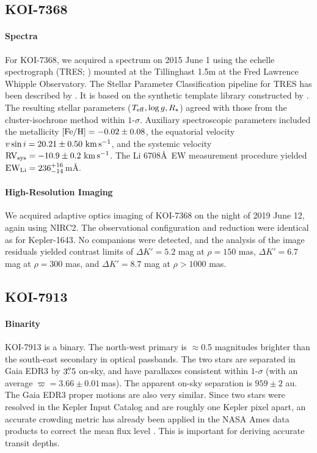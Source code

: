 \documentclass[12pt,twocolumn,tighten,linenumbers,trackchanges]{aastex63}
\newcommand{\mkms}{{\rm \,km\,s^{-1}}}  %
\begin{document}
\subsection{KOI-7368}
\paragraph{Spectra}
For KOI-7368, we acquired a spectrum on 2015 June 1 using the echelle
spectrograph (TRES; \citealt{furesz_tres_2008}) mounted at the
Tillinghast 1.5m at the Fred Lawrence Whipple Observatory.  The
Stellar Parameter Classification pipeline for TRES has been described
by \citet{2021tsc2.confE.124B}.  It is based on the synthetic template
library constructed by \citet{Buchhave2012}.  The resulting stellar
parameters ($T_{\rm eff}, \log g, R_\star$) agreed with those from the
cluster-isochrone method within $1$-$\sigma$.  Auxiliary
spectroscopic parameters included the metallicity $[{\rm Fe/H}]= -0.02
\pm 0.08$, the equatorial velocity $v\sin i = 20.21 \pm 0.50\,\mkms$,
and the systemic velocity ${\rm RV}_{\rm sys} = -10.9 \pm 0.2\,\mkms$.
The Li 6708\AA\ EW measurement procedure yielded ${\rm EW}_{\rm Li} =
236^{+16}_{-14}$\,m\AA.

\paragraph{High-Resolution Imaging}
We acquired adaptive optics imaging of KOI-7368 on the night of 2019
June 12, again using NIRC2.  The observational configuration and
reduction were identical as for Kepler-1643.  No companions were
detected, and the analysis of the image residuals yielded contrast
limits of $\Delta K' = 5.2$ mag at $\rho = 150$ mas, $\Delta K' = 6.7$
mag at $\rho = 300$ mas, and $\Delta K' = 8.7$ mag at $\rho > 1000$
mas.

\subsection{KOI-7913}
\label{subsec:koi7913}

\paragraph{Binarity}
KOI-7913 is a binary.  The north-west primary is
$\approx$0.5 magnitudes brighter than the south-east secondary in
optical passbands.  The two stars are separated in Gaia EDR3 by
$3\mbox{$.\!\!^{\prime\prime}$}5$ on-sky, and have parallaxes consistent within $1$-$\sigma$
(with an average $\varpi=3.66 \pm 0.01$\,mas).  The apparent on-sky
separation is $959 \pm 2$ au.  The Gaia EDR3 proper motions are also
very similar.  Since two stars were resolved in the Kepler Input
Catalog and are roughly one Kepler pixel apart, an accurate crowding
metric has already been applied in the NASA Ames data products to
correct the mean flux level \citep{2017ksci.rept....6M}.  This is
important for deriving accurate transit depths.
\end{document}
